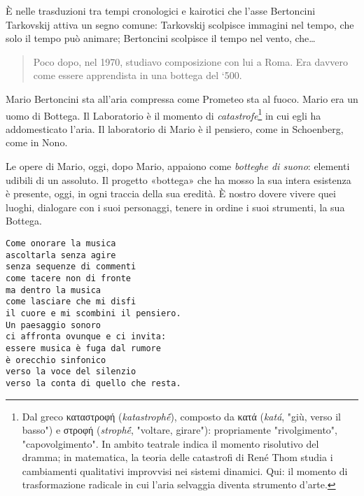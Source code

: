 È nelle trasduzioni tra tempi cronologici e kairotici che l'asse Bertoncini Tarkovskij
attiva un segno comune: Tarkovskij scolpisce immagini nel tempo, che solo il tempo può animare; Bertoncini scolpisce
il tempo nel vento, che\ldots

\begin{quote}
Poco dopo, nel 1970, studiavo composizione con lui a Roma. Era davvero come essere apprendista in una bottega del ‘500. \cite{nottoli2019}
\end{quote}

Mario Bertoncini sta all'aria compressa come Prometeo sta al fuoco. Mario era un
uomo di Bottega. Il Laboratorio è il momento di \emph{catastrofe}\footnote{%
  Dal greco \textgreek{καταστροφή} (\emph{katastrophḗ}), composto da
  \textgreek{κατά} (\emph{katá}, "giù, verso il basso") e \textgreek{στροφή}
  (\emph{strophḗ}, "voltare, girare"): propriamente "rivolgimento",
  "capovolgimento". In ambito teatrale indica il momento risolutivo del dramma;
  in matematica, la teoria delle catastrofi di René Thom \cite{thom1972} studia
  i cambiamenti qualitativi improvvisi nei sistemi dinamici. Qui: il momento
  di trasformazione radicale in cui l'aria selvaggia diventa strumento d'arte.
} in cui egli ha
addomesticato l'aria. Il laboratorio di Mario è il pensiero, come in Schoenberg,
come in Nono.

Le opere di Mario, oggi, dopo Mario, appaiono come \emph{botteghe di suono}: elementi udibili di un assoluto. Il
progetto «bottega» che ha mosso la sua intera esistenza è presente, oggi, in ogni
traccia della sua eredità. È nostro dovere vivere quei luoghi, dialogare con i suoi personaggi, tenere in ordine i suoi strumenti, la sua Bottega.

\null\vfill
\begin{verbatim}
Come onorare la musica
ascoltarla senza agire
senza sequenze di commenti
come tacere non di fronte
ma dentro la musica
come lasciare che mi disfi
il cuore e mi scombini il pensiero.
Un paesaggio sonoro
ci affronta ovunque e ci invita:
essere musica è fuga dal rumore
è orecchio sinfonico
verso la voce del silenzio
verso la conta di quello che resta.
\end{verbatim}

